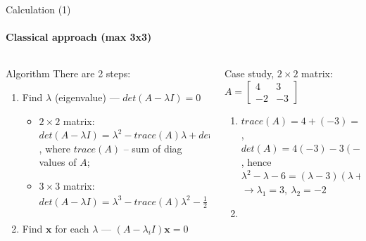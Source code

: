 \documentclass[aspectratio=169]{beamer}
\begin{document}
\begin{frame}[t]{Calculation (1)}
    \framesubtitle{Classical approach (max 3x3)}
    \vspace{-0.8cm}
    \begin{columns}[T,onlytextwidth]
        \begin{column}{0.48\textwidth}
            \begin{block}{Algorithm}
            There are 2 steps:
            \begin{enumerate}
                \item Find $\lambda$ (eigenvalue) --- $det(A-\lambda I)=0$
                \begin{itemize}
                    \item $2\times2$ matrix: $det(A-\lambda I) = \lambda^2 - trace(A)\lambda + det(A) = 0$, where $trace(A)$ -- sum of diag values of $A$;
                    \item $3\times3$ matrix: $det(A-\lambda I) = \lambda^3 - trace(A)\lambda^2 - \frac{1}{2}(trace(A^2)-trace(A)^2)\lambda - det(A) = 0$ 
                \end{itemize}
                \item Find $\mathbf{x}$ for each $\lambda$ --- $(A-\lambda_i I)\mathbf{x} = 0 $
            \end{enumerate}
        \end{block}
        \end{column}
        \begin{column}{0.49\textwidth}
            \begin{example}
            Case study, $2\times 2$ matrix: $A= \begin{bmatrix}
            4 & 3\\ 
            -2 & -3 
            \end{bmatrix}$
        \begin{enumerate}
            \item $trace(A)= 4 + (-3)=1$, $det(A) = 4(-3) - 3(-2)=-6$, hence \\
            $\lambda^2 - \lambda - 6 = (\lambda-3)(\lambda+2),\ \rightarrow$ \\ $\rightarrow \lambda_1 = 3,\ \lambda_2=-2$
            \item 
\end{enumerate}
\end{example}
\end{column}
\end{columns}
\end{frame}
\end{document}
